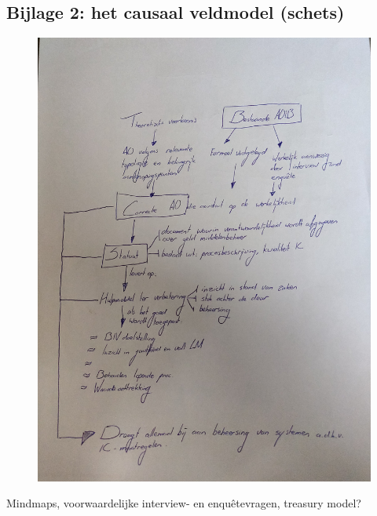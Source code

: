 \documentclass[10pt,a4paper,oneside]{report}
\begin{document}
\newpage

\subsection*{\hypertarget{bij:veldmodel}{Bijlage 2}: het causaal veldmodel \color{red}(schets)\color{black}}
\begin{figure}[ht]
    \centering
    \includegraphics[angle=-90,width=\textwidth]{veldmodel}
    \label{fig:veldmodel}
\end{figure}

\color{red}
\noindent
Mindmaps, voorwaardelijke interview- en enquêtevragen, treasury model?
\end{document}

